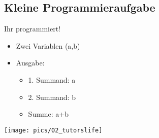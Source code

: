 \documentclass{beamer}
\begin{document}
\subsection{Kleine Programmieraufgabe}
\begin{frame}{Ihr programmiert!}
\begin{exampleblock}{}
\begin{itemize}
\item Zwei Variablen (a,b)
\item Ausgabe:
\begin{itemize}
\item 1. Summand: a
\item 2. Summand: b
\item Summe: a+b
\end{itemize}
\end{itemize}
\end{exampleblock}
\end{frame}

\begin{frame}
 \texttt{[image: pics/02\_tutorslife]} 
\end{frame}
\end{document}

